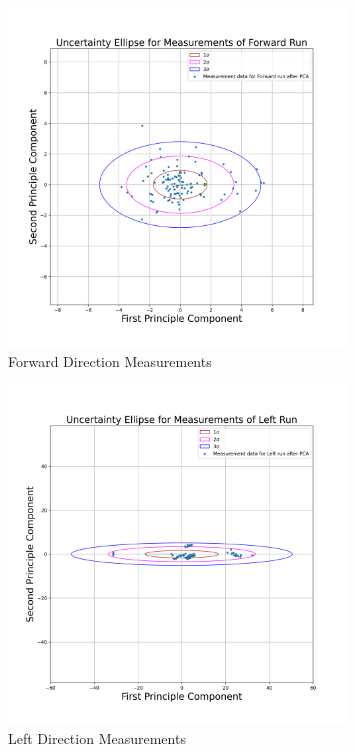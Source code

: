     
    \begin{figure}[!ht] 
            \centering 
            \includegraphics[width=0.8\textwidth]{"images/experiment_3/Uncertainty Ellipse for Measurements of Forward Run.png"}
            \caption{Forward Direction Measurements}
            \label{fig:ellipseforwardafter}
    \end{figure}
    \begin{figure}[!ht] 
            \centering 
            \includegraphics[width=0.8\textwidth]{"images/experiment_3/Uncertainty Ellipse for Measurements of Left Run.png"}
            \caption{Left Direction Measurements}
            \label{fig:ellipseleftafter}
    \end{figure}
